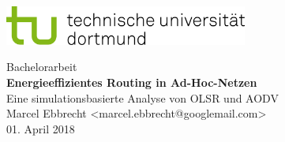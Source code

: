 
\begin{titlepage}
\vspace*{-2cm}
\newlength{\links}
\setlength{\links}{-0.5cm}
\sffamily
\hspace*{\links}
\begin{minipage}{12.5cm}
\includegraphics[width=8cm]{bilder/tud_logo_rgb}
\end{minipage}

\vspace*{6cm}

\hspace*{\links}
\hspace*{-0.2cm}
\begin{minipage}{9.5cm}
\large
\begin{center}
{\Large Bachelorarbeit} \\
\vspace*{1cm}
\textbf{Energieeffizientes Routing in Ad-Hoc-Netzen}\\\small{Eine simulationsbasierte Analyse von OLSR und AODV}
\vspace*{1cm}
\normalsize
\\Marcel Ebbrecht <marcel.ebbrecht@googlemail.com>\\
01. April 2018\\
\end{center}
\end{minipage}
\normalsize
\vspace*{3.5cm}


\vspace*{2.1cm}


\end{titlepage}
